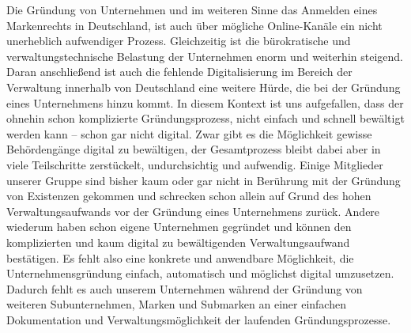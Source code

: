 Die Gründung von Unternehmen und im weiteren Sinne das Anmelden eines Markenrechts in Deutschland, ist auch über mögliche Online-Kanäle ein nicht unerheblich aufwendiger Prozess.
Gleichzeitig ist die bürokratische und verwaltungstechnische Belastung der Unternehmen enorm und weiterhin steigend. Daran anschließend ist auch die fehlende Digitalisierung im Bereich der Verwaltung innerhalb von Deutschland eine weitere Hürde, die bei der Gründung eines Unternehmens hinzu kommt.
In diesem Kontext ist uns aufgefallen, dass der ohnehin schon komplizierte Gründungsprozess, nicht einfach und schnell bewältigt werden kann – schon gar nicht digital. Zwar gibt es die Möglichkeit gewisse Behördengänge digital zu bewältigen, der Gesamtprozess bleibt dabei aber in viele Teilschritte zerstückelt, undurchsichtig und aufwendig.
Einige Mitglieder unserer Gruppe sind bisher kaum oder gar nicht in Berührung mit der Gründung von Existenzen gekommen und schrecken schon allein auf Grund des hohen Verwaltungsaufwands vor der Gründung eines Unternehmens zurück. Andere wiederum haben schon eigene Unternehmen gegründet und können den komplizierten und kaum digital zu bewältigenden Verwaltungsaufwand bestätigen.
Es fehlt also eine konkrete und anwendbare Möglichkeit, die Unternehmensgründung einfach, automatisch und möglichst digital umzusetzen. Dadurch fehlt es auch unserem Unternehmen während der Gründung von weiteren Subunternehmen, Marken und Submarken an einer einfachen Dokumentation und Verwaltungsmöglichkeit der laufenden Gründungsprozesse.